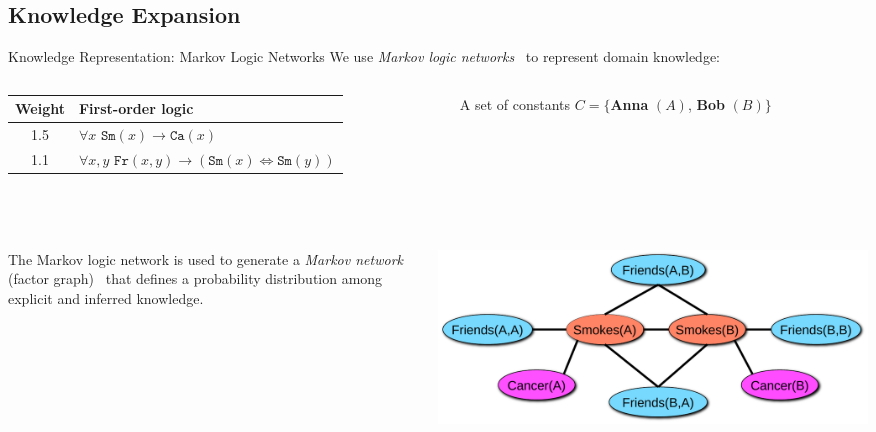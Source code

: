 \documentclass[onlymath,xcolor=pdftex,dvipsnames,table]{beamer}
\let\oldemph\emph
\renewcommand{\emph}[1]{{\color{Blue}\oldemph{#1}}}
\theoremstyle{remark} %
\begin{document}
\subsection{Knowledge Expansion}
\begin{frame}[fragile]{Knowledge Representation: Markov Logic Networks}
We use \emph{Markov logic networks}~\cite{richardson2006markov} to represent domain knowledge:
\mbox{\phantom{m}}\\[10pt]
\begin{columns}
  \begin{column}{.5\textwidth}\tiny
    \centering
    \begin{tabular}{cl}\toprule
      \textbf{Weight} & \textbf{First-order logic}\\
      \midrule
      1.5 & $\forall x\texttt{ Sm}(x)\rightarrow\texttt{Ca}(x)$\\
      1.1 & $\forall x,y\texttt{ Fr}(x,y)\rightarrow(\texttt{Sm}(x)\Leftrightarrow\texttt{Sm}(y))$\\
      \bottomrule
    \end{tabular}
  \end{column}
  \begin{column}{.5\textwidth}
    A set of constants $C=\{$\textbf{Anna} $(A)$, \textbf{Bob} $(B)$$\}$
  \end{column}
\end{columns}
\mbox{\phantom{m}}\\[10pt]
\begin{columns}
  \begin{column}{.5\textwidth}\small
The Markov logic network is used to generate a \emph{Markov network} (factor graph)~\cite{koller2009probabilistic,kschischang2001factor,wick2010scalable} that defines a probability distribution among explicit and inferred knowledge.
  \end{column}
  \begin{column}{.5\textwidth}
    \includegraphics[width=\columnwidth]{mn.pdf}
  \end{column}
\end{columns}
\end{frame}
\end{document}
